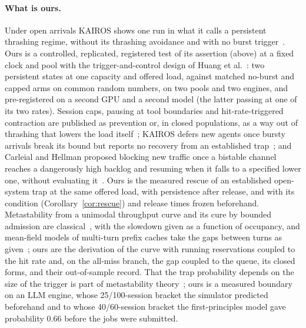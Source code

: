 \paragraph{What is ours.} Under open arrivals KAIROS shows one run in what it calls a persistent thrashing regime, without its thrashing avoidance and with no burst trigger~\citep{yuan2026kairos}. Ours is a controlled, replicated, registered test of its assertion (above) at a fixed clock and pool with the trigger-and-control design of Huang et al.~\citep{huang2022metastable}: two persistent states at one capacity and offered load, against matched no-burst and capped arms on common random numbers, on two pools and two engines, and pre-registered on a second GPU and a second model (the latter passing at one of its two rates). Session caps, pausing at tool boundaries and hit-rate-triggered contraction are published as prevention or, in closed populations, as a way out of thrashing that lowers the load itself~\citep{kang2026thunderagent,dhanani2026dynamo,chen2026concur,hong2026misat}; KAIROS defers new agents once bursty arrivals break its bound but reports no recovery from an established trap~\citep{yuan2026kairos}; and Carleial and Hellman proposed blocking new traffic once a bistable channel reaches a dangerously high backlog and resuming when it falls to a specified lower one, without evaluating it~\citep{carleial1975bistable}. Ours is the measured rescue of an established open-system trap at the same offered load, with persistence after release, and with its condition (Corollary~\ref{cor:rescue}) and release times frozen beforehand. Metastability from a unimodal throughput curve and its cure by bounded admission are classical~\citep{kleinrock1975aloha,carleial1975bistable,courtois1975decomposability,nelson1987stochastic}, with the slowdown given as a function of occupancy, and mean-field models of multi-turn prefix caches take the gaps between turns as given~\citep{yao2026multiturn}; ours are the derivation of the curve with running reservations coupled to the hit rate and, on the all-miss branch, the gap coupled to the queue, its closed forms, and their out-of-sample record. That the trap probability depends on the size of the trigger is part of metastability theory~\citep{bronson2021metastable,huang2022metastable,isaacs2025analyzing}; ours is a measured boundary on an LLM engine, whose 25/100-session bracket the simulator predicted beforehand and to whose 40/60-session bracket the first-principles model gave probability 0.66 before the jobs were submitted.

